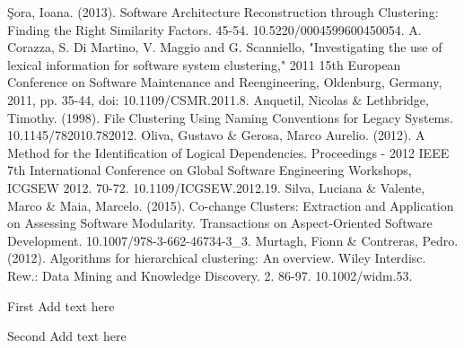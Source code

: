 \documentclass{ieeeaccess}
\begin{document}
\begin{thebibliography}{00}
 Şora, Ioana. (2013). Software Architecture Reconstruction through Clustering: Finding the Right Similarity Factors. 45-54. 10.5220/0004599600450054. 
 A. Corazza, S. Di Martino, V. Maggio and G. Scanniello, "Investigating the use of lexical information for software system clustering," 2011 15th European Conference on Software Maintenance and Reengineering, Oldenburg, Germany, 2011, pp. 35-44, doi: 10.1109/CSMR.2011.8.
 Anquetil, Nicolas \& Lethbridge, Timothy. (1998). File Clustering Using Naming Conventions for Legacy Systems. 10.1145/782010.782012. 
 Oliva, Gustavo \& Gerosa, Marco Aurelio. (2012). A Method for the Identification of Logical Dependencies. Proceedings - 2012 IEEE 7th International Conference on Global Software Engineering Workshops, ICGSEW 2012. 70-72. 10.1109/ICGSEW.2012.19. 
 Silva, Luciana \& Valente, Marco \& Maia, Marcelo. (2015). Co-change Clusters: Extraction and Application on Assessing Software Modularity. Transactions on Aspect-Oriented Software Development. 10.1007/978-3-662-46734-3\_3. 
 Murtagh, Fionn \& Contreras, Pedro. (2012). Algorithms for hierarchical clustering: An overview. Wiley Interdisc. Rew.: Data Mining and Knowledge Discovery. 2. 86-97. 10.1002/widm.53. 


\end{thebibliography}

\begin{IEEEbiographynophoto}{First} Add text here
\end{IEEEbiographynophoto}

\begin{IEEEbiographynophoto}{Second} Add text here
\end{IEEEbiographynophoto}

\EOD
\end{document}
